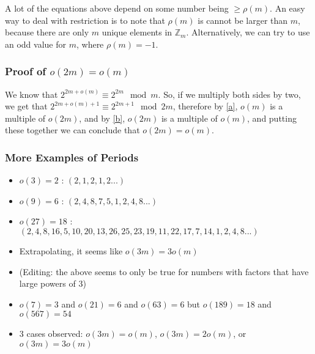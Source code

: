 \documentclass{article}
\begin{document}
  A lot of the equations above depend on some number being $\geq \rho(m)$. An easy way to deal with restriction is to note that $\rho(m)$ is cannot be larger than $m$, because there are only $m$ unique elements in $\mathbb{Z}_m$. Alternatively, we can try to use an odd value for $m$, where $\rho(m) = -1$.
  \subsubsection{Proof of $o(2m) = o(m)$}
  We know that $2^{2m+o(m)} \equiv 2^{2m} \mod m$. So, if we multiply both sides by two, we get that $2^{2m + o(m) + 1}\equiv 2^{2m+1} \mod 2m$, therefore by \eqref{a}, $o(m)$ is a multiple of $o(2m)$, and by \eqref{b}, $o(2m)$ is a multiple of $o(m)$, and putting these together we can conclude that $o(2m) = o(m)$.
  \subsubsection{More Examples of Periods}
  \begin{itemize}
  \item $o(3) = 2$ : $(2, 1, 2, 1, 2 ...)$
  \item $o(9) = 6$ : $(2, 4, 8, 7, 5, 1, 2, 4, 8 ...)$
  \item $o(27) = 18$ : $(2, 4, 8, 16, 5, 10, 20, 13, 26, 25, 23, 19, 11, 22, 17, 7, 14, 1, 2, 4, 8 ...)$
  \item Extrapolating, it seems like $o(3m) = 3o(m)$
  \item (Editing: the above seems to only be true for numbers with factors that have large powers of 3)
  \item $o(7) = 3$ and $o(21) = 6$ and $o(63) = 6$ but $o(189) = 18$ and $o(567) = 54$
  \item 3 cases observed: $o(3m) = o(m)$, $o(3m) = 2o(m)$, or $o(3m) = 3o(m)$
  \end{itemize}
\end{document}
